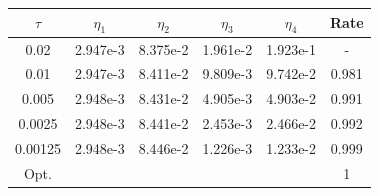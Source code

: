 \begin{center} 
\centering
\begin{tabular}{c|c|c|c|c|c}
$\tau$ & $\eta_1$ & $\eta_2$ & $\eta_3$ & $\eta_4$ & Rate\\\hline
0.02    & 2.947e-3 & 8.375e-2 & 1.961e-2 & 1.923e-1 & -    \\
0.01    & 2.947e-3 & 8.411e-2 & 9.809e-3 & 9.742e-2 & 0.981\\
0.005   & 2.948e-3 & 8.431e-2 & 4.905e-3 & 4.903e-2 & 0.991\\
0.0025  & 2.948e-3 & 8.441e-2 & 2.453e-3 & 2.466e-2 & 0.992\\
0.00125 & 2.948e-3 & 8.446e-2 & 1.226e-3 & 1.233e-2 & 0.999\\\hline
Opt. & & & & & 1
\end{tabular}
 \label{tab:biot_default_time_est}
\end{center}
\mbox{}\\ \\
